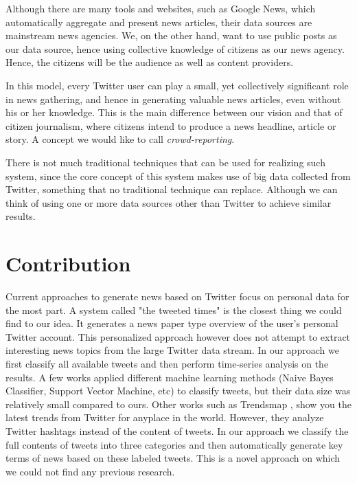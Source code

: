 \documentclass{llncs}
\begin{document}
Although there are many tools and websites, such as Google News, which automatically aggregate and present news articles, their data sources are  mainstream news agencies. We, on the other hand, want to use public posts as our data source, hence using collective knowledge of citizens as our news agency. Hence, the citizens will be the audience as well as content providers.

In this model, every Twitter user can play a small, yet collectively significant role in news gathering, and hence in generating valuable news articles, even without his or her knowledge. This is the main difference between our vision and that of citizen journalism, where citizens intend to produce a news headline, article or story. A concept we would like to call \textit{crowd-reporting}.

There is not much traditional techniques that can be used for realizing such system, since the core concept of this system makes use of big data collected from Twitter, something that no traditional technique can replace. Although we can think of using one or more data sources other than Twitter to achieve similar results.

\section{Contribution}
Current approaches to generate news based on Twitter focus on personal data for the most part. A system called "the tweeted times" \cite{tweeted-times} is the closest thing we could find to our idea. It generates a news paper type overview of the user's personal Twitter account. This personalized approach however does not attempt to extract interesting news topics from the large Twitter data stream. In our approach we first classify all available tweets and then perform time-series analysis on the results. A few works \cite{Go_Bhayani_Huang_2009,twitter-classifier} applied different machine learning methods (Naive Bayes Classifier, Support Vector Machine, etc) to classify tweets, but their data size was relatively small compared to ours. Other works such as Trendsmap \cite{Trendmap}, show you the latest trends from Twitter for anyplace in the world. However, they analyze Twitter hashtags instead of the content of tweets. In our approach we classify the full contents of tweets into three categories and then automatically generate key terms of news based on these labeled tweets. This is a novel approach on which we could not find any previous research.
\end{document}
